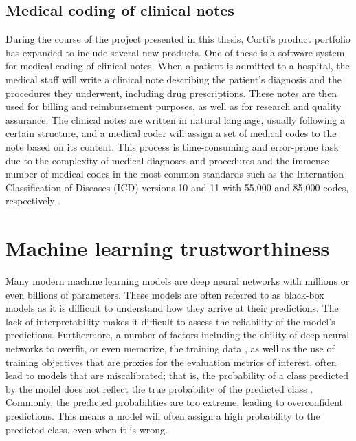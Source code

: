 \subsection{Medical coding of clinical notes}


During the course of the project presented in this thesis, Corti's product portfolio has expanded to include several new products. 
One of these is a software system for medical coding of clinical notes. 
When a patient is admitted to a hospital, the medical staff will write a clinical note describing the patient's diagnosis and the procedures they underwent, including drug prescriptions. 
These notes are then used for billing and reimbursement purposes, as well as for research and quality assurance. 
The clinical notes are written in natural language, usually following a certain structure, and a medical coder will assign a set of medical codes to the note based on its content. 
This process is time-consuming and error-prone task due to the complexity of medical diagnoses and procedures and the immense number of medical codes in the most common standards such as the Internation Classification of Diseases (ICD) versions 10 and 11 with 55,000 and 85,000 codes, respectively \cite{worldhealthorganisationwho_international_2023}.




\section{Machine learning trustworthiness}

Many modern machine learning models are deep neural networks with millions or even billions of parameters. 
These models are often referred to as black-box models as it is difficult to understand how they arrive at their predictions.
The lack of interpretability makes it difficult to assess the reliability of the model's predictions.
Furthermore, a number of factors including the ability of deep neural networks to overfit, or even memorize, the training data \cite{arpit_closer_2017, burg_memorization_2021}, as well as the use of training objectives that are proxies for the evaluation metrics of interest, often lead to models that are miscalibrated; that is, the probability of a class predicted by the model does not reflect the true probability of the predicted class \cite{guo_calibration_2017, kull_temperature_2019}. Commonly, the predicted probabilities are too extreme, leading to overconfident predictions. This means a model will often assign a high probability to the predicted class, even when it is wrong.

